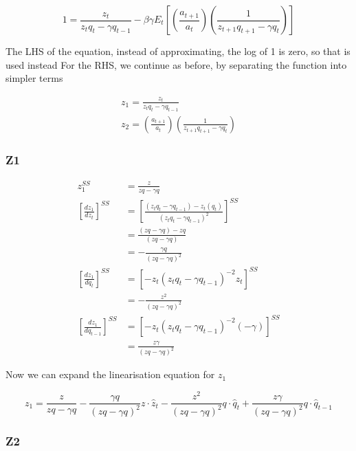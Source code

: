 \documentclass[11pt,preprint, authoryear]{elsarticle}
\numberwithin{equation}{section}
\numberwithin{figure}{section}
\numberwithin{table}{section}
\begin{document}
\[1=\frac{z_{t}}{z_{t} q_{t}-\gamma q_{t-1}}-\beta \gamma E_{t}\left[\left(\frac{a_{t+1}}{a_{t}}\right)\left(\frac{1}{z_{t+1} q_{t+1}-\gamma q_{t}}\right)\right]\]

The LHS of the equation, instead of approximating, the log of 1 is zero,
so that is used instead For the RHS, we continue as before, by
separating the function into simpler terms

\[\begin{aligned}
z_1 = \frac{z_{t}}{z_{t} q_{t}-\gamma q_{t-1}} \\
z_2 = \left(\frac{a_{t+1}}{a_{t}}\right)\left(\frac{1}{z_{t+1} q_{t+1}-\gamma q_{t}}\right)
\end{aligned}\]

\hypertarget{z1}{%
\subsubsection{Z1}\label{z1}}

\[\begin{aligned}
z_{1}^{SS}&= \frac{z}{z q-\gamma q} \\
\left[\frac{dz_{1}}{dz_{t}} \right]^{SS} &=
\left[\frac{\left(z_{t} q_{t}-\gamma q_{t-1}\right)-z_{t}\left(q_{t}\right)}{\left(z_{t} q_{t}-\gamma 
q_{t-1}\right)^{2}}\right]^{SS}\\
&=\frac{(z q-\gamma q)-z q}{(z q-\gamma q)}\\
&=-\frac{\gamma q}{(zq-\gamma q)^2}\\
\left[\frac{dz_{1}}{dq_{t}} \right]^{SS} &= \left[-z_{t}\left(z_{t} q_{t}-\gamma q_{t-1}\right)^{-2} z_{t} \right]^{SS} \\
&= -\frac{z^{2}}{\left(z q-\gamma q\right)^2}\\
\left[\frac{dz_{1}}{dq_{t-1}} \right]^{SS} &= \left[-z_{t}\left(z_{t} q_{t}-\gamma q_{t-1}\right)^{-2}(-\gamma)\right]^{SS} \\
&=\frac{z \gamma}{(z q-\gamma q)^2}
\end{aligned}\]

Now we can expand the linearisation equation for \(z_1\)

\[z_1 = \frac{z}{z q-\gamma q} 
- \frac{\gamma q}{(z q-\gamma q)^2} z \cdot \hat{z}_t
- \frac{z^{2}}{(z q-\gamma q)^2} q \cdot \hat{q}_t
+ \frac{z \gamma}{(z q-\gamma q)^2} q \cdot \hat{q}_{t-1}\]

\hypertarget{z2}{%
\subsubsection{Z2}\label{z2}}
\end{document}

